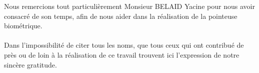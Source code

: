 \begin{titlepage}
Nous remercions tout particulièrement Monsieur BELAID Yacine pour nous avoir
consacré de son temps, afin de nous aider dans la réalisation de la pointeuse 
biométrique.

\paragraph{}

Dans l’impossibilité de citer tous les noms, que tous ceux qui ont contribué de
près ou de loin à la réalisation de ce travail trouvent ici l’expression de notre 
sincère gratitude.  

\thispagestyle{empty}		

\end{titlepage}	
